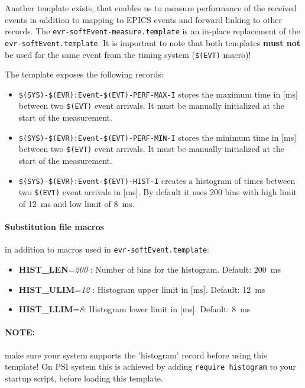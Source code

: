 \documentclass[12pt,a4paper]{article}
\begin{document}
Another template exists, that enables us to measure performance of the received events in addition to mapping to EPICS events and forward linking to other records. The \texttt{evr-softEvent-measure.template} is an in-place replacement of the  \texttt{evr-softEvent.template}. It is important to note that both templates \textbf{must not} be used for the same event from the timing system (\texttt{\$(EVT)} macro)! 

The template exposes the following records:
\begin{itemize}
\item 
  \texttt{\$(SYS)-\$(EVR):Event-\$(EVT)-PERF-MAX-I} stores the maximum time in [ms] between two \texttt{\$(EVT)} event arrivals. It must be manually initialized at the start of the measurement.
\item 
  \texttt{\$(SYS)-\$(EVR):Event-\$(EVT)-PERF-MIN-I} stores the minimum time in [ms] between two \texttt{\$(EVT)} event arrivals. It must be manually initialized at the start of the measurement.
\item 
  \texttt{\$(SYS)-\$(EVR):Event-\$(EVT)-HIST-I} creates a histogram of times between two \texttt{\$(EVT)} event arrivals in [ms]. By default it uses 200 bins with high limit of 12~ms and low limit of 8~ms.
\end{itemize}

\paragraph{Substitution file macros} in addition to macros used in \texttt{evr-softEvent.template}:
\begin{itemize}
	\item
		\textbf{HIST\_LEN}=\emph{200} : Number of bins for the histogram. Default: 200~ms
	\item
		\textbf{HIST\_ULIM}=\emph{12} : Histogram upper limit in [ms]. Default: 12~ms
	\item
	  \textbf{HIST\_LLIM}=\emph{8}: Histogram lower limit in [ms]. Default: 8~ms
\end{itemize}
 
 
\paragraph{NOTE:} make sure your system supports the 'histogram' record before using this template! On PSI system this is achieved by adding \texttt{require histogram} to your startup script, before loading this template.
\end{document}
